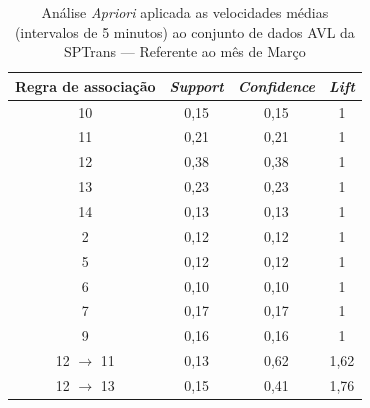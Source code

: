 \documentclass[
	12pt,				%
	oneside,			%
	a4paper,			%
	english,			%
	brazil				%
	]{abntex2ppgsi}
\begin{document}
{{\begin{apendicesenv}
\begin{table}[!htb]
\centering
\caption {Análise \textit{Apriori} aplicada as velocidades médias (intervalos de 5 minutos) ao conjunto de dados AVL da SPTrans --- Referente ao mês de Março}
\label {tab:aprioriMarch}
\begin{tabular}{c|c|c|c}
\toprule
\textbf{Regra de associação} & \textit{\textbf{Support}} & \textit{\textbf{Confidence}} & \textit{\textbf{Lift}} \\
\midrule 
10 &  0,15 &  0,15 &  1\\ 
\hline 
11 &  0,21 &  0,21 &  1\\ 
\hline 
12 &  0,38 &  0,38 &  1\\ 
\hline 
13 &  0,23 &  0,23 &  1\\ 
\hline 
14 &  0,13 &  0,13 &  1\\ 
\hline 
2 &  0,12 &  0,12 &  1\\ 
\hline 
5 &  0,12 &  0,12 &  1\\ 
\hline 
6 &  0,10 &  0,10 &  1\\ 
\hline 
7 &  0,17 &  0,17 &  1\\ 
\hline 
9 &  0,16 &  0,16 &  1\\ 
\hline 
12 $\rightarrow$ 11 &  0,13 &  0,62 &  1,62\\ 
\hline 
12 $\rightarrow$ 13 &  0,15 &  0,41 &  1,76\\
\bottomrule
\end{tabular}
\end{table}



\end{apendicesenv}}}
\end{document}
